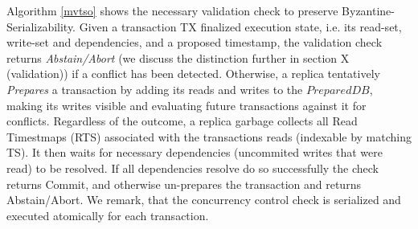 Algorithm \ref{mvtso} shows the necessary validation check to preserve Byzantine-Serializability. 
Given a transaction TX finalized execution state, i.e. its read-set, write-set and dependencies, and a proposed timestamp, the validation check returns \textit{Abstain/Abort} (we discuss the distinction further in section X (validation)) if a conflict has been detected. Otherwise, a replica tentatively \textit{Prepares} a transaction by adding its reads and writes to the $PreparedDB$, making its writes visible and evaluating future transactions against it for conflicts. Regardless of the outcome, a replica garbage collects all Read Timestmaps (RTS) associated with the transactions reads (indexable by matching TS).
It then waits for necessary dependencies (uncommited writes that were read) to be resolved. 
If all dependencies resolve do so successfully the check returns Commit, and otherwise un-prepares the transaction and returns Abstain/Abort. We remark, that the concurrency control check is serialized and executed atomically for each transaction.


 





